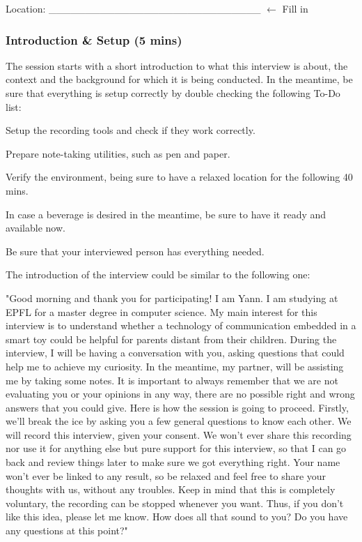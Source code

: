 Location: \hfill \_\_\_\_\_\_\_\_\_\_\_\_\_\_\_\_\_\_\_\_\_\_\_\_\_\_\_\_\_ $\leftarrow$ Fill in

\vspace{6pt}
\subsubsection{Introduction \& Setup (5 mins)}

The session starts with a short introduction to what this interview is about, the context and the background for which it is being conducted. In the meantime, be sure that everything is setup correctly by double checking the following To-Do list:

\begin{todolist}
    \item Setup the recording tools and check if they work correctly.
    \item Prepare note-taking utilities, such as pen and paper.
    \item Verify the environment, being sure to have a relaxed location for the following 40 mins.
    \item In case a beverage is desired in the meantime, be sure to have it ready and available now.
    \item Be sure that your interviewed person has everything needed.
\end{todolist}

The introduction of the interview could be similar to the following one:

"Good morning and thank you for participating! I am Yann. I am studying at EPFL for a master degree in computer science. My main interest for this interview is to understand whether  a  technology  of  communication embedded in a smart toy could be helpful for parents distant from their children. During the interview, I will be having a conversation with you, asking questions that could help me to achieve my curiosity. In the meantime, my partner, will be assisting me by taking some notes. It is important to always remember that we are not evaluating you or your opinions in any way, there are no possible right and wrong answers that you could give. 
Here is how the session is going to proceed. Firstly, we'll break the ice by asking you a few general questions to know each other. We will record this interview, given your consent. We won't ever share this recording nor use it for anything else but pure support for this interview, so that I can go back and review things later to make sure we got everything right. Your name won't ever be linked to any result, so be relaxed and feel free to share your thoughts with us, without any troubles. Keep in mind that this is completely voluntary, the recording can be stopped whenever you want. Thus, if you don't like this idea, please let me know. 
How does all that sound to you? Do you have any questions at this point?"

